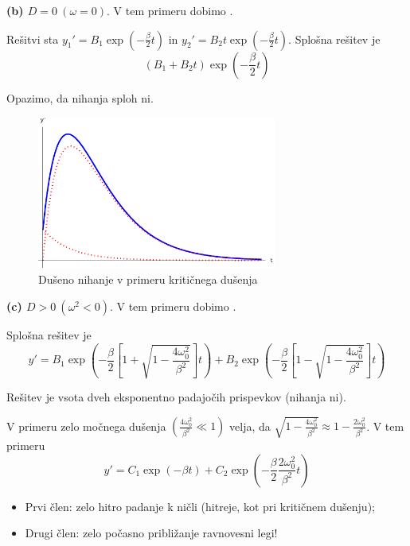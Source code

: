 \newpage
\textbf{(b) \(D = 0 \ (\omega = 0)\)}. V tem primeru dobimo .

Rešitvi sta \(y_1' = B_1 \exp \left(-\frac{\beta}{2}t\right)\) in \(y_2' = B_2 t \exp \left(-\frac{\beta}{2}t\right)\). Splošna rešitev je 
\[\boxed{(B_1 + B_2t) \exp \left(-\frac{\beta}{2} t\right)}\]

\begin{opomba}
    Opazimo, da nihanja sploh ni.
\end{opomba}

\begin{figure}[h!]
    \centering
    \includegraphics[width=0.7\textwidth]{img/01_003.pdf}
    \caption{Dušeno nihanje v primeru kritičnega dušenja}      
\end{figure}

\textbf{(c) \(D > 0 \ (\omega^2 < 0)\)}. V tem primeru dobimo . 

Splošna rešitev je 
\[
\boxed{y' = B_1 \exp \left(- \frac{\beta}{2} \left[1 + \sqrt{1 - \frac{4 \omega_0^2}{\beta^2}}\right]t\right) + B_2 \exp \left(- \frac{\beta}{2} \left[1 - \sqrt{1 - \frac{4 \omega_0^2}{\beta^2}}\right]t\right)} 
\]

\begin{opomba}
    Rešitev je vsota dveh eksponentno padajočih prispevkov (nihanja ni).
\end{opomba}

V primeru zelo močnega dušenja \((\frac{4\omega_0^2}{\beta^2} \ll 1)\) velja, da \(\sqrt{1 - \frac{4 \omega_0^2}{\beta^2}} \approx 1 - \frac{2\omega_0^2}{\beta^2}\). V tem primeru 
\[
y' = C_1 \exp (-\beta t) + C_2 \exp \left(-\frac{\beta}{2} \frac{2 \omega_0^2}{\beta^2}t\right)
\]

\begin{itemize}
    \item Prvi člen: zelo hitro padanje k ničli (hitreje, kot pri kritičnem dušenju);
    \item Drugi člen: zelo počasno približanje ravnovesni legi!
\end{itemize}

